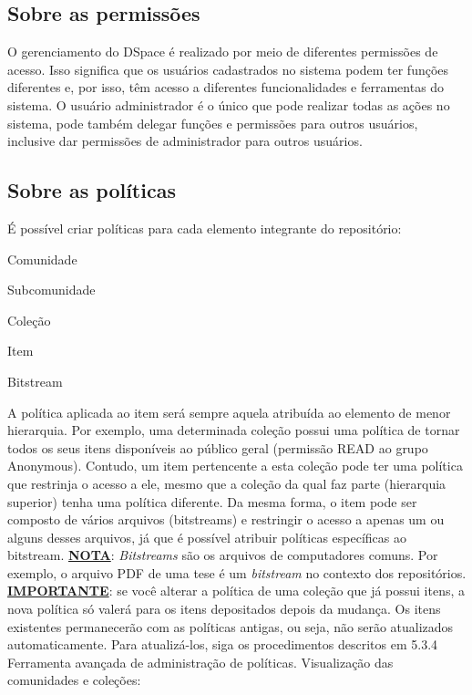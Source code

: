 \documentclass[12pt,hidelinks]{article}
\begin{document}
        \subsection{Sobre as permissões}
        O gerenciamento do DSpace é realizado por meio de diferentes permissões de acesso. Isso significa que os usuários cadastrados no sistema podem ter funções diferentes e, por isso, têm acesso a diferentes funcionalidades e ferramentas do sistema. O usuário administrador é o único que pode realizar todas as ações no sistema, pode também delegar funções e permissões para outros usuários, inclusive dar permissões de administrador para outros usuários.
        
        \subsection{Sobre as políticas}
        É possível criar políticas para cada elemento integrante do repositório:
        
            \centerline{Comunidade}      
            \centerline{Subcomunidade}      
            \centerline{Coleção}      
            \centerline{Item}      
            \centerline{Bitstream}
        \singlespacing
        A política aplicada ao item será sempre aquela atribuída ao elemento de menor hierarquia. Por exemplo, uma determinada coleção possui uma política de tornar todos os seus itens disponíveis ao público geral (permissão READ ao grupo Anonymous). Contudo, um item pertencente a esta coleção pode ter uma política que restrinja o acesso a ele, mesmo que a coleção da qual faz parte (hierarquia superior) tenha uma política diferente. Da mesma forma, o item pode ser composto de vários arquivos (bitstreams) e restringir o acesso a apenas um ou alguns desses arquivos, já que é possível atribuir políticas específicas ao bitstream.
        \singlespacing
        \textbf{\underline{NOTA}}: \emph{Bitstreams}  são os arquivos de computadores comuns. Por exemplo, o arquivo PDF de uma tese é um \emph{bitstream} no contexto dos repositórios.
        \singlespacing
        \textbf{\underline{IMPORTANTE}}: se você alterar a política de uma coleção que já possui itens, a nova política só valerá para os itens depositados depois da mudança. Os itens existentes permanecerão com as políticas antigas, ou seja, não serão atualizados automaticamente. Para atualizá-los, siga os procedimentos descritos em 5.3.4 Ferramenta avançada de administração de políticas.
\newpage
        Visualização das comunidades e coleções:
        
\end{document}
